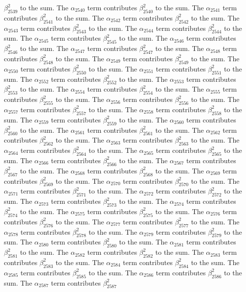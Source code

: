 \begin{lemma}
$\beta_{2539}^{2}$ to the sum. The $\alpha_{2540}$ term contributes $\beta_{2540}^{2}$ to the sum. The $\alpha_{2541}$ term contributes $\beta_{2541}^{2}$ to the sum. The $\alpha_{2542}$ term contributes $\beta_{2542}^{2}$ to the sum. The $\alpha_{2543}$ term contributes $\beta_{2543}^{2}$ to the sum. The $\alpha_{2544}$ term contributes $\beta_{2544}^{2}$ to the sum. The $\alpha_{2545}$ term contributes $\beta_{2545}^{2}$ to the sum. The $\alpha_{2546}$ term contributes $\beta_{2546}^{2}$ to the sum. The $\alpha_{2547}$ term contributes $\beta_{2547}^{2}$ to the sum. The $\alpha_{2548}$ term contributes $\beta_{2548}^{2}$ to the sum. The $\alpha_{2549}$ term contributes $\beta_{2549}^{2}$ to the sum. The $\alpha_{2550}$ term contributes $\beta_{2550}^{2}$ to the sum. The $\alpha_{2551}$ term contributes $\beta_{2551}^{2}$ to the sum. The $\alpha_{2552}$ term contributes $\beta_{2552}^{2}$ to the sum. The $\alpha_{2553}$ term contributes $\beta_{2553}^{2}$ to the sum. The $\alpha_{2554}$ term contributes $\beta_{2554}^{2}$ to the sum. The $\alpha_{2555}$ term contributes $\beta_{2555}^{2}$ to the sum. The $\alpha_{2556}$ term contributes $\beta_{2556}^{2}$ to the sum. The $\alpha_{2557}$ term contributes $\beta_{2557}^{2}$ to the sum. The $\alpha_{2558}$ term contributes $\beta_{2558}^{2}$ to the sum. The $\alpha_{2559}$ term contributes $\beta_{2559}^{2}$ to the sum. The $\alpha_{2560}$ term contributes $\beta_{2560}^{2}$ to the sum. The $\alpha_{2561}$ term contributes $\beta_{2561}^{2}$ to the sum. The $\alpha_{2562}$ term contributes $\beta_{2562}^{2}$ to the sum. The $\alpha_{2563}$ term contributes $\beta_{2563}^{2}$ to the sum. The $\alpha_{2564}$ term contributes $\beta_{2564}^{2}$ to the sum. The $\alpha_{2565}$ term contributes $\beta_{2565}^{2}$ to the sum. The $\alpha_{2566}$ term contributes $\beta_{2566}^{2}$ to the sum. The $\alpha_{2567}$ term contributes $\beta_{2567}^{2}$ to the sum. The $\alpha_{2568}$ term contributes $\beta_{2568}^{2}$ to the sum. The $\alpha_{2569}$ term contributes $\beta_{2569}^{2}$ to the sum. The $\alpha_{2570}$ term contributes $\beta_{2570}^{2}$ to the sum. The $\alpha_{2571}$ term contributes $\beta_{2571}^{2}$ to the sum. The $\alpha_{2572}$ term contributes $\beta_{2572}^{2}$ to the sum. The $\alpha_{2573}$ term contributes $\beta_{2573}^{2}$ to the sum. The $\alpha_{2574}$ term contributes $\beta_{2574}^{2}$ to the sum. The $\alpha_{2575}$ term contributes $\beta_{2575}^{2}$ to the sum. The $\alpha_{2576}$ term contributes $\beta_{2576}^{2}$ to the sum. The $\alpha_{2577}$ term contributes $\beta_{2577}^{2}$ to the sum. The $\alpha_{2578}$ term contributes $\beta_{2578}^{2}$ to the sum. The $\alpha_{2579}$ term contributes $\beta_{2579}^{2}$ to the sum. The $\alpha_{2580}$ term contributes $\beta_{2580}^{2}$ to the sum. The $\alpha_{2581}$ term contributes $\beta_{2581}^{2}$ to the sum. The $\alpha_{2582}$ term contributes $\beta_{2582}^{2}$ to the sum. The $\alpha_{2583}$ term contributes $\beta_{2583}^{2}$ to the sum. The $\alpha_{2584}$ term contributes $\beta_{2584}^{2}$ to the sum. The $\alpha_{2585}$ term contributes $\beta_{2585}^{2}$ to the sum. The $\alpha_{2586}$ term contributes $\beta_{2586}^{2}$ to the sum. The $\alpha_{2587}$ term contributes $\beta_{2587}^{2}$ 
\end{lemma}
